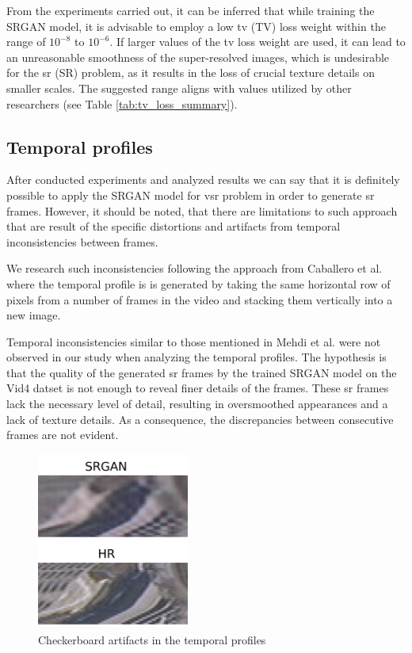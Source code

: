 \documentclass[conference]{IEEEtran}
\begin{document}
From the experiments carried out, it can be inferred that while training the SRGAN model, it is advisable to employ a low \acrlong{tv} (TV) loss weight within the range of $10^{-8}$ to $10^{-6}$. If larger values of the \acrshort{tv} loss weight are used, it can lead to an unreasonable smoothness of the super-resolved images, which is undesirable for the \acrlong{sr} (SR) problem, as it results in the loss of crucial texture details on smaller scales. The suggested range aligns with values utilized by other researchers (see Table \ref{tab:tv_loss_summary}).

\subsection{Temporal profiles}

After conducted experiments and analyzed results we can say that it is definitely possible to apply the SRGAN model for \acrshort{vsr} problem in order to generate \acrshort{sr} frames. However, it should be noted, that there are limitations to such approach that are result of the specific distortions and artifacts from temporal inconsistencies between frames.

We research such inconsistencies following the approach from Caballero et al. \cite{Real_Time_Video_Super_Resolution_with_Spatio_Temporal_Networks_and_Motion_Compensation_2016} where the temporal profile is is generated by taking the same horizontal row of pixels from a number of frames in the video and stacking them vertically into a new image.

Temporal inconsistencies similar to those mentioned in Mehdi et al. \cite{frvsr_2018} were not observed in our study when analyzing the temporal profiles. The hypothesis is that the quality of the generated \acrshort{sr} frames by the trained SRGAN model on the Vid4 datset is not enough to reveal finer details of the frames. These \acrshort{sr} frames lack the necessary level of detail, resulting in oversmoothed appearances and a lack of texture details. As a consequence, the discrepancies between consecutive frames are not evident.

\begin{figure}[!htb]
	\centering
    \centerline{\includegraphics[width=5cm]{results/tempo/checkboard_artifacts}}
	\caption{Checkerboard artifacts in the temporal profiles}
	\label{fig:checkerboard_artifacts}
\end{figure}
\end{document}
